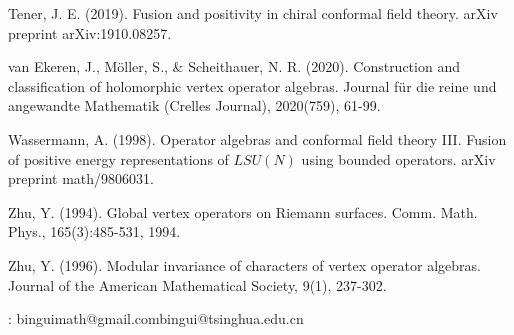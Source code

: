 \documentclass[11pt,b5paper,notitlepage]{article}
\theoremstyle{definition}
\theoremstyle{plain}
\numberwithin{equation}{section}
\begin{document}
\begin{thebibliography}{999999}
Tener, J. E. (2019). Fusion and positivity in chiral conformal field theory. arXiv preprint arXiv:1910.08257.

van Ekeren, J., Möller, S., \& Scheithauer, N. R. (2020). Construction and classification of holomorphic vertex operator algebras. Journal für die reine und angewandte Mathematik (Crelles Journal), 2020(759), 61-99.

Wassermann, A. (1998). Operator algebras and conformal field theory III. Fusion of positive energy representations of $LSU (N)$ using bounded operators. arXiv preprint math/9806031.


Zhu, Y. (1994). Global vertex operators on Riemann surfaces. Comm. Math. Phys., 165(3):485-531, 1994.



Zhu, Y. (1996). Modular invariance of characters of vertex operator algebras. Journal of the American Mathematical Society, 9(1), 237-302.


		
\end{thebibliography}


: binguimath@gmail.com\qquad bingui@tsinghua.edu.cn
\end{document}
